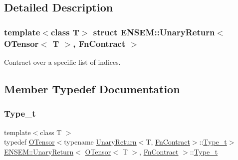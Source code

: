 \subsection{Detailed Description}
\subsubsection*{template$<$class T$>$\newline
struct E\+N\+S\+E\+M\+::\+Unary\+Return$<$ O\+Tensor$<$ T $>$, Fn\+Contract $>$}

Contract over a specific list of indices. 

\subsection{Member Typedef Documentation}
\mbox{\label{structENSEM_1_1UnaryReturn_3_01OTensor_3_01T_01_4_00_01FnContract_01_4_a5b94783dc2f622ca8629f6318a2332ac}} 
\subsubsection{\texorpdfstring{Type\_t}{Type\_t}\hspace{0.1cm}{\footnotesize\ttfamily [1/3]}}
{\footnotesize\ttfamily template$<$class T $>$ \\
typedef \mbox{\hyperlink{classENSEM_1_1OTensor}{O\+Tensor}}$<$typename \mbox{\hyperlink{structENSEM_1_1UnaryReturn}{Unary\+Return}}$<$T, \mbox{\hyperlink{structENSEM_1_1FnContract}{Fn\+Contract}}$>$\+::\mbox{\hyperlink{structENSEM_1_1UnaryReturn_3_01OTensor_3_01T_01_4_00_01FnContract_01_4_a5b94783dc2f622ca8629f6318a2332ac}{Type\+\_\+t}}$>$ \mbox{\hyperlink{structENSEM_1_1UnaryReturn}{E\+N\+S\+E\+M\+::\+Unary\+Return}}$<$ \mbox{\hyperlink{classENSEM_1_1OTensor}{O\+Tensor}}$<$ T $>$, \mbox{\hyperlink{structENSEM_1_1FnContract}{Fn\+Contract}} $>$\+::\mbox{\hyperlink{structENSEM_1_1UnaryReturn_3_01OTensor_3_01T_01_4_00_01FnContract_01_4_a5b94783dc2f622ca8629f6318a2332ac}{Type\+\_\+t}}}

\mbox{\label{structENSEM_1_1UnaryReturn_3_01OTensor_3_01T_01_4_00_01FnContract_01_4_a5b94783dc2f622ca8629f6318a2332ac}} 
